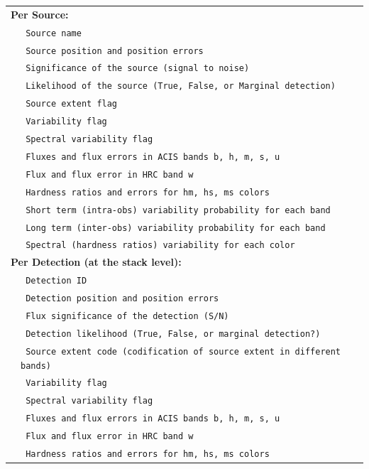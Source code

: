 \documentclass[11pt,a4paper]{ivoa}
\begin{document}
\begin{table}[ht!]
  \tiny
  \begin{tabular}{|p{0.4cm}p{10.0cm}|}
    \hline
    \multicolumn{2}{|l|}{\textbf{Per Source:}} \\
    & \texttt{ Source name } \\
    & \texttt{ Source position and position errors } \\
    & \texttt{ Significance of the source (signal to noise) } \\
    & \texttt{ Likelihood of the source  (True, False, or Marginal detection) } \\
    & \texttt{ Source extent flag } \\
    & \texttt{ Variability flag } \\
    & \texttt{ Spectral variability flag } \\
    & \texttt{ Fluxes and flux errors in ACIS bands b, h, m, s, u } \\
    & \texttt{ Flux and flux error in  HRC band w } \\
    & \texttt{ Hardness ratios and errors for hm, hs, ms colors } \\
    & \texttt{ Short term (intra-obs) variability probability for each band } \\
    & \texttt{ Long term (inter-obs) variability probability for each band } \\
    & \texttt{ Spectral (hardness ratios) variability for each color } \\
    \hline
    \multicolumn{2}{|l|}{\textbf{Per Detection (at the stack level):}} \\
    & \texttt{ Detection ID } \\
    & \texttt{ Detection position and position errors } \\
    & \texttt{ Flux significance of the detection (S/N) } \\
    & \texttt{ Detection likelihood (True, False, or marginal detection?) } \\
    & \texttt{ Source extent code (codification of source extent in different bands) } \\
    & \texttt{ Variability flag } \\
    & \texttt{ Spectral variability flag } \\
    & \texttt{ Fluxes and flux errors in ACIS bands b, h, m, s, u } \\
    & \texttt{ Flux and flux error in  HRC band w } \\
    & \texttt{ Hardness ratios and errors for hm, hs, ms colors } \\

\end{tabular}
\end{table}
\end{document}
